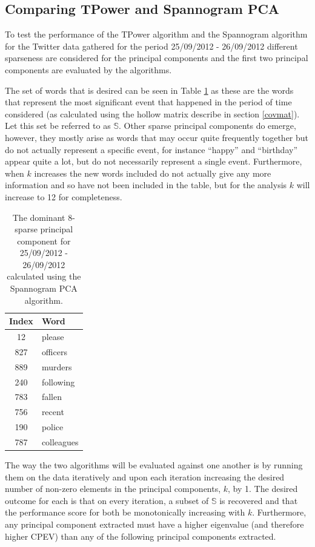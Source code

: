 \documentclass[11pt,a4paper]{article}
\begin{document}
\subsection{Comparing TPower and Spannogram PCA}
\label{comparison}
To test the performance of the TPower algorithm and the Spannogram algorithm for the Twitter data gathered for the period 25/09/2012 - 26/09/2012 different sparseness are considered for the principal components and the first two principal components are evaluated by the algorithms. 

The set of words that is desired can be seen in Table \ref{murder_8} as these are the words that represent the most significant event that happened in the period of time considered (as calculated using the hollow matrix describe in section \ref{covmat}). Let this set be referred to as $\mathbb{S}$. Other sparse principal components do emerge, however, they mostly arise as words that may occur quite frequently together but do not actually represent a specific event, for instance ``happy'' and ``birthday'' appear quite  a lot, but do not necessarily represent a single event. Furthermore, when $k$ increases the new words included do not actually give any more information and so have not been included in the table, but for the analysis $k$ will increase to 12 for completeness.

\begin{table}[H]
\center
\begin{tabular}{| c l |}
\hline
Index & Word \\
\hline
12 & please\\
827 & officers \\
889 & murders \\
240 & following\\
783 & fallen \\
756 & recent\\ 
190 & police\\
787 & colleagues\\
\hline
\end{tabular}
\caption{The dominant 8-sparse principal component for 25/09/2012 - 26/09/2012 calculated using the Spannogram PCA algorithm.}
\label{murder_8}
\end{table}

The way the two algorithms will be evaluated against one another is by running them on the data iteratively and upon each iteration increasing the desired number of non-zero elements in the principal components, $k$, by 1. The desired outcome for each is that on every iteration, a subset of $\mathbb{S}$ is recovered and that the performance score for both be monotonically increasing with $k$. Furthermore, any principal component extracted must have a higher eigenvalue (and therefore higher CPEV) than any of the following principal components extracted. 
\end{document}
